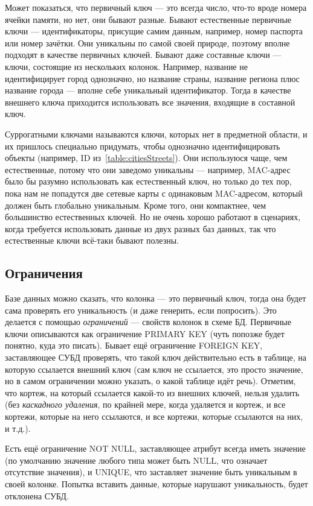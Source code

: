 \documentclass[a5paper]{article}
\begin{document}
Может показаться, что первичный ключ --- это всегда число, что-то вроде номера ячейки памяти, но нет, они бывают разные. Бывают естественные первичные ключи --- идентификаторы, присущие самим данным, например, номер паспорта или номер зачётки. Они уникальны по самой своей природе, поэтому вполне подходят в качестве первичных ключей. Бывают даже составные ключи --- ключи, состоящие из нескольких колонок. Например, название не идентифицирует город однозначно, но название страны, название региона плюс название города --- вполне себе уникальный идентификатор. Тогда в качестве внешнего ключа приходится использовать все значения, входящие в составной ключ.

Суррогатными ключами называются ключи, которых нет в предметной области, и их пришлось специально придумать, чтобы однозначно идентифицировать объекты (например, ID из~\ref{table:citiesStreets}). Они используюся чаще, чем естественные, потому что они заведомо уникальны --- например, MAC-адрес было бы разумно использовать как естественный ключ, но только до тех пор, пока нам не попадутся две сетевые карты с одинаковым MAC-адресом, который должен быть глобально уникальным. Кроме того, они компактнее, чем большинство естественных ключей. Но не очень хорошо работают в сценариях, когда требуется использовать данные из двух разных баз данных, так что естественные ключи всё-таки бывают полезны.

\subsection{Ограничения}

Базе данных можно сказать, что колонка --- это первичный ключ, тогда она будет сама проверять его уникальность (и даже генерить, если попросить). Это делается с помощью \textit{ограничений} --- свойств колонок в схеме БД. Первичные ключи описываются как ограничение PRIMARY KEY (чуть попозже будет понятно, куда это писать). Бывает ещё ограничение FOREIGN KEY, заставляющее СУБД проверять, что такой ключ действительно есть в таблице, на которую ссылается внешний ключ (сам ключ не ссылается, это просто значение, но в самом ограничении можно указать, о какой таблице идёт речь). Отметим, что кортеж, на который ссылается какой-то из внешних ключей, нельзя удалить (без \textit{каскадного удаления}, по крайней мере, когда удаляется и кортеж, и все кортежи, которые на него ссылаются, и все кортежи, которые ссылаются на них, и т.д.).

Есть ещё ограничение NOT NULL, заставляющее атрибут всегда иметь значение (по умолчанию значение любого типа может быть NULL, что означает отсутствие значения), и UNIQUE, что заставляет значение быть уникальным в своей колонке. Попытка вставить данные, которые нарушают уникальность, будет отклонена СУБД.
\end{document}
